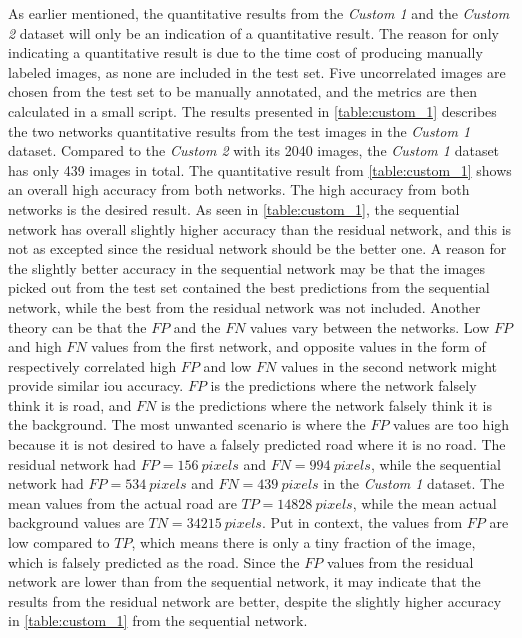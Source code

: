 \documentclass[USenglish]{ifimaster}  %
\begin{document}
As earlier mentioned, the quantitative results from the \textit{Custom 1} and the \textit{Custom 2} dataset will only be an indication of a quantitative result. The reason for only indicating a quantitative result is due to the time cost of producing manually labeled images, as none are included in the test set. Five uncorrelated images are chosen from the test set to be manually annotated, and the metrics are then calculated in a small script. The results presented in \cref{table:custom_1} describes the two networks quantitative results from the test images in the \textit{Custom 1} dataset. Compared to the \textit{Custom 2} with its 2040 images, the \textit{Custom 1} dataset has only 439 images in total. The quantitative result from \cref{table:custom_1} shows an overall high accuracy from both networks. The high accuracy from both networks is the desired result. As seen in \cref{table:custom_1}, the sequential network has overall slightly higher accuracy than the residual network, and this is not as excepted since the residual network should be the better one. A reason for the slightly better accuracy in the sequential network may be that the images picked out from the test set contained the best predictions from the sequential network, while the best from the residual network was not included. Another theory can be that the $FP$ and the $FN$ values vary between the networks. Low $FP$ and high $FN$ values from the first network, and opposite values in the form of respectively correlated high $FP$ and low $FN$ values in the second network might provide similar \ac{iou} accuracy. $FP$ is the predictions where the network falsely think it is road, and $FN$ is the predictions where the network falsely think it is the background. The most unwanted scenario is where the $FP$ values are too high because it is not desired to have a falsely predicted road where it is no road. The residual network had $FP=156\ pixels$ and $FN=994\ pixels$, while the sequential network had $FP=534\ pixels$ and $FN=439\ pixels$ in the \textit{Custom 1} dataset. The mean values from the actual road are $TP=14828\ pixels$, while the mean actual background values are $TN=34215\ pixels$. Put in context, the values from $FP$ are low compared to $TP$, which means there is only a tiny fraction of the image, which is falsely predicted as the road. Since the $FP$ values from the residual network are lower than from the sequential network, it may indicate that the results from the residual network are better, despite the slightly higher accuracy in \cref{table:custom_1} from the sequential network. 
\end{document}
